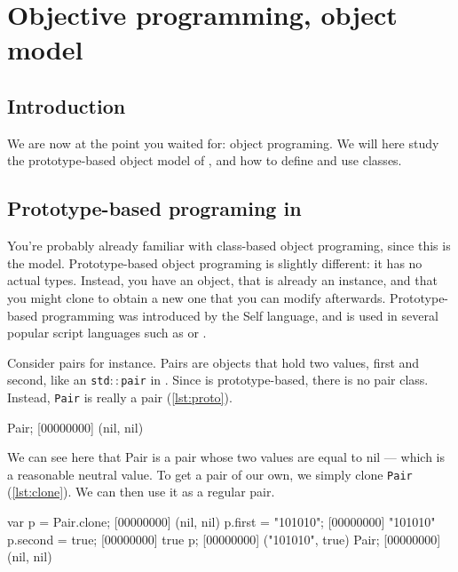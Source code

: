 \documentclass[openright,twoside,12pt]{report}
\begin{document}
\chapter{Objective programming, \urbi object model}
\label{section:objective}


\section{Introduction}

We are now at the point you waited for: object programing. We will
here study the prototype-based object model of \urbi, and how to
define and use classes.

\section{Prototype-based programing in \urbi}

You're probably already familiar with class-based object programing,
since this is the \Cxx model. Prototype-based object programing is
slightly different: it has no actual types. Instead, you have an
object, that is already an instance, and that you might clone to
obtain a new one that you can modify afterwards. Prototype-based
programming was introduced by the Self language, and is used in
several popular script languages such as \io or \js.

Consider pairs for instance. Pairs are objects that hold two values,
first and second, like an \texttt{std$::$pair} in \Cxx. Since \urbi is
prototype-based, there is no pair class. Instead, \lstinline|Pair| is
really a pair (\autoref{lst:proto}).

\begin{urbiscript}[caption=Prototypes in \urbi, label=lst:proto]
Pair;
[00000000] (nil, nil)
\end{urbiscript}

We can see here that Pair is a pair whose two values are equal to nil
--- which is a reasonable neutral value. To get a pair of our own, we
simply clone \lstinline|Pair| (\autoref{lst:clone}). We can then use it as a
regular pair.

\begin{urbiscript}[caption=Cloning, label=lst:clone]
var p = Pair.clone;
[00000000] (nil, nil)
p.first = "101010";
[00000000] "101010"
p.second = true;
[00000000] true
p;
[00000000] ("101010", true)
Pair;
[00000000] (nil, nil)
\end{urbiscript}
\end{document}
